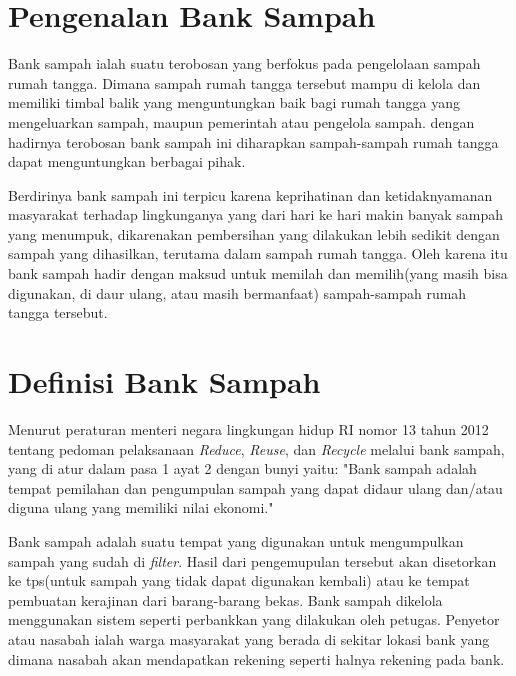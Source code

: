 \section{Pengenalan Bank Sampah}
Bank sampah ialah suatu terobosan yang berfokus pada pengelolaan sampah rumah tangga. Dimana sampah rumah tangga tersebut mampu di kelola dan memiliki timbal balik yang menguntungkan baik bagi rumah tangga yang mengeluarkan sampah, maupun pemerintah atau pengelola sampah. dengan hadirnya terobosan bank sampah ini diharapkan sampah-sampah rumah tangga dapat menguntungkan berbagai pihak. 

Berdirinya bank sampah ini terpicu karena keprihatinan dan ketidaknyamanan masyarakat terhadap lingkunganya yang dari hari ke hari makin banyak sampah yang menumpuk, dikarenakan pembersihan yang dilakukan lebih sedikit dengan sampah yang dihasilkan, terutama dalam sampah rumah tangga. Oleh karena itu bank sampah hadir dengan maksud untuk memilah dan memilih(yang masih bisa digunakan, di daur ulang, atau masih bermanfaat) sampah-sampah rumah tangga tersebut.

\section{Definisi Bank Sampah}
Menurut peraturan menteri negara lingkungan hidup RI nomor 13 tahun 2012 tentang pedoman pelaksanaan \textit{Reduce}, \textit{Reuse}, dan \textit{Recycle} melalui bank sampah, yang di atur dalam pasa 1 ayat 2 dengan bunyi yaitu: "Bank sampah adalah tempat pemilahan dan pengumpulan sampah yang dapat didaur ulang dan/atau diguna ulang yang memiliki nilai ekonomi."

Bank sampah adalah suatu tempat yang digunakan untuk mengumpulkan sampah yang sudah di \textit{filter}. Hasil dari pengemupulan tersebut akan disetorkan ke tps(untuk sampah yang tidak dapat digunakan kembali) atau ke tempat pembuatan kerajinan dari barang-barang bekas. Bank sampah dikelola menggunakan sistem seperti perbankkan yang dilakukan oleh petugas. Penyetor atau nasabah ialah warga masyarakat yang berada di sekitar lokasi bank yang dimana nasabah akan mendapatkan rekening seperti halnya rekening pada bank.\cite{1}

